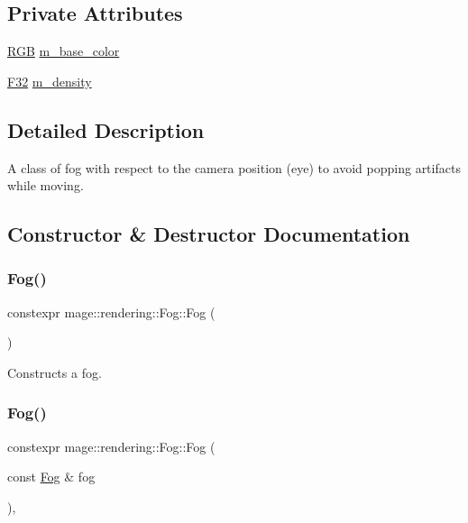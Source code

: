 \subsection*{Private Attributes}
\begin{DoxyCompactItemize}
\item 
\mbox{\hyperlink{structmage_1_1_r_g_b}{R\+GB}} \mbox{\hyperlink{classmage_1_1rendering_1_1_fog_a5f7d0bcb79a1d68b2456bd005db48a99}{m\+\_\+base\+\_\+color}}
\item 
\mbox{\hyperlink{namespacemage_aa97e833b45f06d60a0a9c4fc22ae02c0}{F32}} \mbox{\hyperlink{classmage_1_1rendering_1_1_fog_aa7a402ad9eef0e9916bb9f83751ebe32}{m\+\_\+density}}
\end{DoxyCompactItemize}


\subsection{Detailed Description}
A class of fog with respect to the camera position (eye) to avoid popping artifacts while moving. 

\subsection{Constructor \& Destructor Documentation}
\mbox{\label{classmage_1_1rendering_1_1_fog_a48489b0ce940aff4395eb5ea88394081}} 
\subsubsection{\texorpdfstring{Fog()}{Fog()}\hspace{0.1cm}{\footnotesize\ttfamily [1/3]}}
{\footnotesize\ttfamily constexpr mage\+::rendering\+::\+Fog\+::\+Fog (\begin{DoxyParamCaption}{ }\end{DoxyParamCaption})\hspace{0.3cm}{\ttfamily [noexcept]}}

Constructs a fog. \mbox{\label{classmage_1_1rendering_1_1_fog_a2f730d70ed426468f113d44e7810394b}} 
\subsubsection{\texorpdfstring{Fog()}{Fog()}\hspace{0.1cm}{\footnotesize\ttfamily [2/3]}}
{\footnotesize\ttfamily constexpr mage\+::rendering\+::\+Fog\+::\+Fog (\begin{DoxyParamCaption}\item[{const \mbox{\hyperlink{classmage_1_1rendering_1_1_fog}{Fog}} \&}]{fog }\end{DoxyParamCaption})\hspace{0.3cm}{\ttfamily [default]}, {\ttfamily [noexcept]}}


